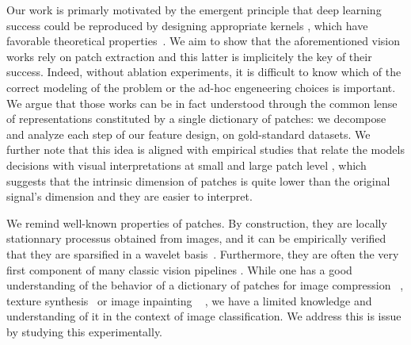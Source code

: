 \documentclass{article}
\begin{document}
Our work is primarly motivated by the emergent principle that  deep learning success  could be reproduced by   designing appropriate kernels \citep{mairal2016end,li2019enhanced,shankar2020neural,lu2014scale}, which have favorable theoretical properties~\citep{jacot2018neural,rahimi2008random}. We aim to show that  the aforementioned vision works rely on patch extraction and this latter is implicitely the key of their success.  Indeed, without ablation experiments, it is difficult to know which of  the correct modeling of the problem or  the ad-hoc engeneering choices is important. We argue that those works can be in fact understood through the common  lense of representations constituted by a single dictionary of patches: we decompose and analyze each step of our feature design, on gold-standard  datasets. We further note that this idea is aligned with empirical studies that relate the models decisions with visual interpretations at small and large patch level
\citep{zeiler2014visualizing,brendel2019approximating}, which suggests that the intrinsic dimension of patches is quite  lower than the original signal's dimension and they are easier to interpret.



We remind well-known properties of patches. By construction,  they are locally stationnary processus obtained from images, and it can be empirically verified that they are sparsified in a wavelet basis~\citep{mallat1999wavelet}. Furthermore, they are often the very first component of many classic vision pipelines \citep{perronnin2010improving,lowe2004distinctive,brendel2019approximating,oyallon2018scattering}. While one has a good understanding of the behavior of a dictionary of patches for image compression
~\citep{wallace1992jpeg}, texture synthesis~\citep{efros1999texture} or image inpainting ~\citep{criminisi2004region} , we have a limited knowledge and understanding of it in the context of image classification. We address this is issue by studying this experimentally.
\end{document}
